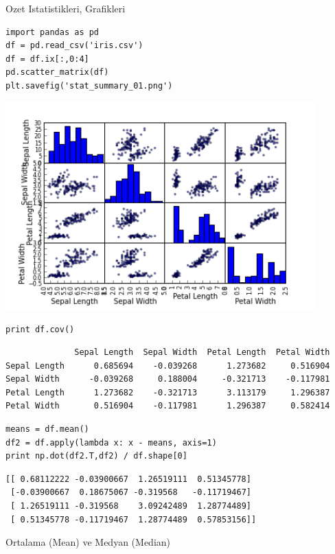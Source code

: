 \documentclass[12pt,fleqn]{article}\usepackage{../common}
\begin{document}
Ozet Istatistikleri, Grafikleri

\begin{verbatim}
import pandas as pd
df = pd.read_csv('iris.csv')
df = df.ix[:,0:4]
pd.scatter_matrix(df)
plt.savefig('stat_summary_01.png')
\end{verbatim}

\includegraphics[height=8cm]{stat_summary_01.png}

\begin{verbatim}
print df.cov()
\end{verbatim}

\begin{verbatim}
              Sepal Length  Sepal Width  Petal Length  Petal Width
Sepal Length      0.685694    -0.039268      1.273682     0.516904
Sepal Width      -0.039268     0.188004     -0.321713    -0.117981
Petal Length      1.273682    -0.321713      3.113179     1.296387
Petal Width       0.516904    -0.117981      1.296387     0.582414
\end{verbatim}

\begin{verbatim}
means = df.mean()
df2 = df.apply(lambda x: x - means, axis=1)
print np.dot(df2.T,df2) / df.shape[0]
\end{verbatim}

\begin{verbatim}
[[ 0.68112222 -0.03900667  1.26519111  0.51345778]
 [-0.03900667  0.18675067 -0.319568   -0.11719467]
 [ 1.26519111 -0.319568    3.09242489  1.28774489]
 [ 0.51345778 -0.11719467  1.28774489  0.57853156]]
\end{verbatim}


Ortalama (Mean) ve Medyan (Median)
\end{document}
